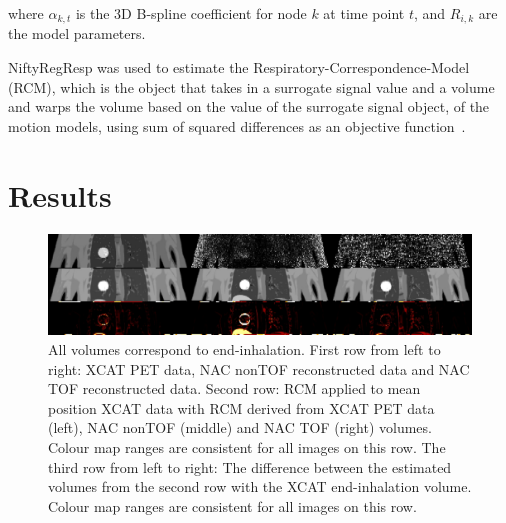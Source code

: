 \documentclass{IEEEtran}
\begin{document}
\noindent where $\alpha_{k,t}$ is the 3D B-spline coefficient for node $k$ at time point $t$, and $R_{i,k}$ are the model parameters. 

NiftyRegResp was used to estimate the Respiratory-Correspondence-Model (RCM), which is the object that takes in a surrogate signal value and a volume and warps the volume based on the value of the surrogate signal object, of the motion models, using sum of squared differences as an objective function~\cite{McClelland2017}.

\vspace{-0.2cm}

\section*{Results}
\begin{figure}
    \vspace{-0.2cm}
    
    \centering
    \includegraphics[width=0.9\linewidth]{figures/output_flipped.png}
    \caption{All volumes correspond to end-inhalation. First row from left to right: XCAT PET data, NAC nonTOF reconstructed data and NAC TOF reconstructed data. Second row: RCM applied to mean position XCAT data with RCM derived from XCAT PET data (left), NAC nonTOF (middle) and NAC TOF (right) volumes. Colour map ranges are consistent for all images on this row. The third row from left to right: The difference between the estimated volumes from the second row with the XCAT end-inhalation volume. Colour map ranges are consistent for all images on this row.}
    \label{fig:output}
    
    \vspace{-0.2cm}
\end{figure}
\end{document}
